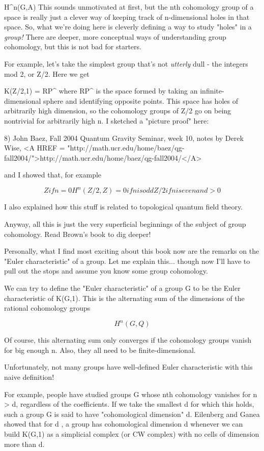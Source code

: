 H^{n}(G,A)
This sounds unmotivated at first, but the nth cohomology group of a
space is really just a clever way of keeping track of n-dimensional 
holes in that space.  So, what we're doing here is cleverly defining
a way to study "holes" in a \emph{group!}  
There are deeper, more conceptual
ways of understanding group cohomology, but this is not bad for starters.

For example, let's take the simplest group that's not \emph{utterly} dull -
the integers mod 2, or Z/2.  Here we get 

K(Z/2,1) = RP^{\infty }
where RP^{\infty } 
is the space formed by taking an infinite-dimensional
sphere and identifying opposite points.  This space has holes of 
arbitrarily high dimension, so the cohomology groups of Z/2 go on being 
nontrivial for arbitrarily high n.  I sketched a "picture proof" here:

8) John Baez, Fall 2004 Quantum Gravity Seminar, week 10, notes
by Derek Wise, <A HREF = "http://math.ucr.edu/home/baez/qg-fall2004/">http://math.ucr.edu/home/baez/qg-fall2004/</A>

and I showed that, for example

$$
            Z   if n = 0
H^{n}(Z/2,Z) = 0   if n is odd
            Z/2 if n is even and > 0
$$
    
I also explained how this stuff is related to topological quantum field
theory.

Anyway, all this is just the very superficial beginnings of the subject
of group cohomology.  Read Brown's book to dig deeper!

Personally, what I find most exciting about this book now are the
remarks on the "Euler characteristic" of a group.  Let me 
explain this...
though now I'll have to pull out the stops and assume you know some
group cohomology.

We can try to define the "Euler characteristic" of a group G to be the 
Euler characteristic of K(G,1).  This is the alternating sum of the 
dimensions of the rational cohomology groups

$$
H^{n}(G,Q)
$$
    

Of course, this alternating sum only converges if the cohomology
groups vanish for big enough n.  Also, they all need to be 
finite-dimensional.

Unfortunately, not many groups have well-defined Euler characteristic
with this naive definition!  

For example, people have studied groups G whose nth cohomology vanishes
for n > d, regardless of the coefficients.  If we take the smallest
d for which this holds, such a group G is said to have "cohomological 
dimension" d.  Eilenberg and Ganea showed that for d , a group has 
cohomological dimension d whenever we can build K(G,1) as a simplicial 
complex (or CW complex) with no cells of dimension more than d.   

